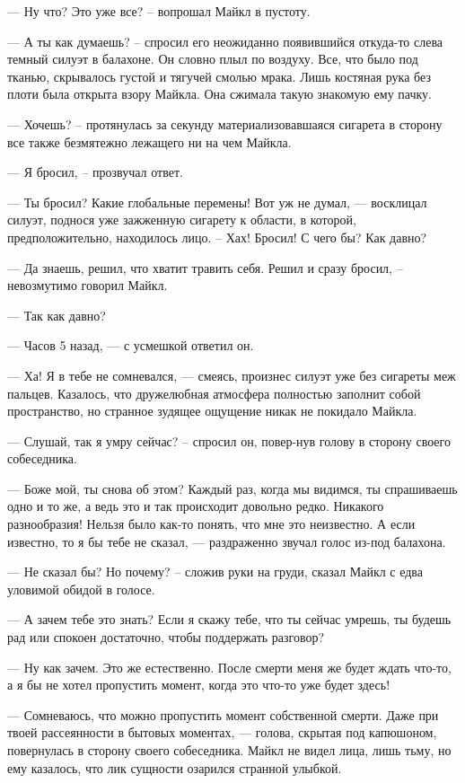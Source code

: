— Ну что? Это уже все? – вопрошал Майкл в пустоту.

— А ты как думаешь? – спросил его неожиданно появившийся откуда-то слева темный силуэт в балахоне. Он словно плыл по воздуху. Все, что было под тканью, скрывалось густой и тягучей смолью мрака. Лишь костяная рука без плоти была открыта взору Майкла. Она сжимала такую знакомую ему пачку.

— Хочешь? – протянулась за секунду материализовавшаяся сигарета в сторону все также безмятежно лежащего ни на чем Майкла.

— Я бросил, – прозвучал ответ.

— Ты бросил? Какие глобальные перемены! Вот уж не думал, — восклицал силуэт, поднося уже зажженную сигарету к области, в которой, предположительно, находилось лицо. – Хах! Бросил! С чего бы? Как давно?

— Да знаешь, решил, что хватит травить себя. Решил и сразу бросил, – невозмутимо говорил Майкл.

— Так как давно?

— Часов 5 назад, — с усмешкой ответил он.

— Ха! Я в тебе не сомневался, — смеясь, произнес силуэт уже без сигареты меж пальцев. Казалось, что дружелюбная атмосфера полностью заполнит собой пространство, но странное зудящее ощущение никак не покидало Майкла.

— Слушай, так я умру сейчас? – спросил он, повер-нув голову в сторону своего собеседника.

— Боже мой, ты снова об этом? Каждый раз, когда мы видимся, ты спрашиваешь одно и то же, а ведь это и так происходит довольно редко. Никакого разнообразия! Нельзя было как-то понять, что мне это неизвестно. А если известно, то я бы тебе не сказал, — раздраженно звучал голос из-под балахона.

— Не сказал бы? Но почему? – сложив руки на груди, сказал Майкл с едва уловимой обидой в голосе.

— А зачем тебе это знать?  Если я скажу тебе, что ты сейчас умрешь, ты будешь рад или спокоен достаточно, чтобы поддержать разговор?

— Ну как зачем. Это же естественно. После смерти меня же будет ждать что-то, а я бы не хотел пропустить момент, когда это что-то уже будет здесь! 

— Сомневаюсь, что можно пропустить момент собственной смерти. Даже при твоей рассеянности в бытовых моментах, — голова, скрытая под капюшоном, повернулась в сторону своего собеседника. Майкл не видел лица, лишь тьму, но ему казалось, что лик сущности озарился странной улыбкой.

